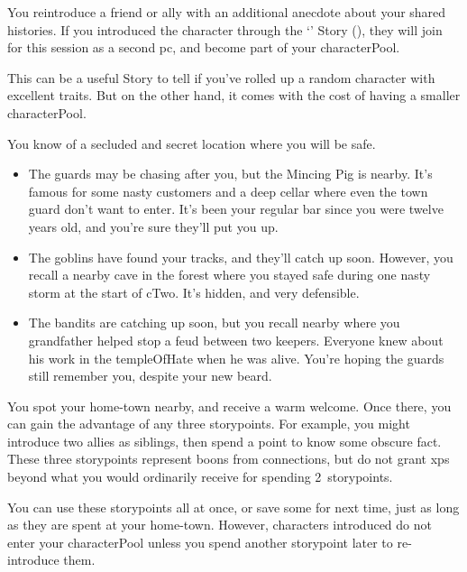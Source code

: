 \begin{multicols}{2}
\label{returnFriend}

You reintroduce a friend or ally with an additional anecdote about your shared histories.
If you introduced the character through the `' Story (), they will join for this session as a second \gls{pc}, and become part of your \gls{characterPool}.

This can be a useful Story to tell if you've rolled up a random character with excellent \glspl{trait}.
But on the other hand, it comes with the cost of having a smaller \gls{characterPool}.

You know of a secluded and secret location where you will be safe.

\begin{itemize}
  \item
  The guards may be chasing after you, but the Mincing Pig is nearby.  It's famous for some nasty customers and a deep cellar where even the town guard don't want to enter.
  It's been your regular bar since you were twelve years old, and you're sure they'll put you up.
  \ifodd\value{r4}%
    \item
    The goblins have found your tracks, and they'll catch up soon.
    However, you recall a nearby cave in the forest where you stayed safe during one nasty \gls{storm} at the start of \gls{cTwo}.
    It's hidden, and very defensible.
  \else%
    \item
    The bandits are catching up soon, but you recall  nearby where you grandfather helped stop a feud between two \glspl{keeper}.
    Everyone knew about his work in the \gls{templeOfHate} when he was alive.
    You're hoping the guards still remember you, despite your new beard.
  \fi%
\end{itemize}

You spot your home-town nearby, and receive a warm welcome.
Once there, you can gain the advantage of any three \glspl{storypoint}.
For example, you might introduce two allies as siblings, then spend a point to know some obscure fact.
These three \glspl{storypoint} represent boons from connections, but do not grant \glspl{xp} beyond what you would ordinarily receive for spending 2~\glspl{storypoint}.

You can use these \glspl{storypoint} all at once, or save some for next time, just as long as they are spent at your home-town.
However, characters introduced do not enter your \gls{characterPool} unless you spend another \gls{storypoint} later to re-introduce them.


\end{multicols}

